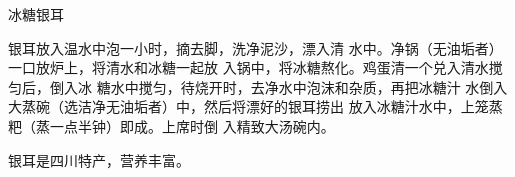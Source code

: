 \begin{recipe}{冰糖银耳}

\ingredients


\cooking

银耳放入温水中泡一小时，摘去脚，洗净泥沙，漂入清 水中。净锅（无油垢者）一口放炉上，将清水和冰糖一起放 入锅中，将冰糖熬化。鸡蛋清一个兑入清水搅匀后，倒入冰 糖水中搅匀，待烧开时，去净水中泡沫和杂质，再把冰糖汁 水倒入大蒸碗（选洁净无油垢者）中，然后将漂好的银耳捞出 放入冰糖汁水中，上笼蒸粑（蒸一点半钟）即成。上席时倒 入精致大汤碗内。

\notes

银耳是四川特产，营养丰富。

\end{recipe}


